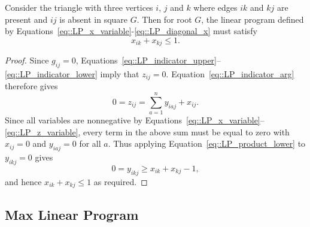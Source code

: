 \begin{lemma} \label{lemma::two_edges_linear_sum}
  Consider the triangle with three vertices $i$, $j$ and $k$ where edges $ik$ and $kj$ are present and $ij$ is absent in square $G$. Then for root $G$, the linear program defined by Equations~\eqref{eq::LP_x_variable}-\eqref{eq::LP_diagonal_x} must satisfy 
  \[
  x_{ik} + x_{kj} \leq 1. 
  \]
\end{lemma}
\begin{proof}
  Since $g_{ij}=0$, Equations~\eqref{eq::LP_indicator_upper}--\eqref{eq::LP_indicator_lower} imply that $z_{ij}=0$.
  Equation~\eqref{eq::LP_indicator_arg} therefore gives
  \[
  0 = z_{ij} = \sum_{a=1}^{n} y_{iaj} + x_{ij}.
  \]
  Since all variables are nonnegative by Equations~\eqref{eq::LP_x_variable}--\eqref{eq::LP_z_variable}, every term in the above sum must be equal to zero with $x_{ij} = 0$ and $y_{iaj} = 0$ for all $a$. Thus applying Equation~\eqref{eq::LP_product_lower} to $y_{ikj} = 0$ gives
  \[
  0 = y_{ikj} \geq x_{ik} + x_{kj} - 1,
  \]
  and hence $x_{ik}+x_{kj} \leq 1$ as required.
\end{proof}

\subsection{Max Linear Program} \label{subsec::triangle_two_edges_max_linear_program}

